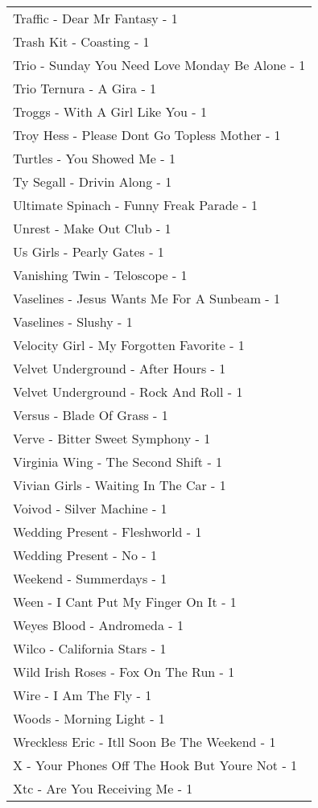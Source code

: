 \documentclass[
]{article}
\begin{document}
\begin{longtable}{l}
Traffic - Dear Mr Fantasy - 1 \\ 
Trash Kit - Coasting - 1 \\ 
Trio - Sunday You Need Love Monday Be Alone - 1 \\ 
Trio Ternura - A Gira - 1 \\ 
Troggs - With A Girl Like You - 1 \\ 
Troy Hess - Please Dont Go Topless Mother - 1 \\ 
Turtles - You Showed Me - 1 \\ 
Ty Segall - Drivin Along - 1 \\ 
Ultimate Spinach - Funny Freak Parade - 1 \\ 
Unrest - Make Out Club - 1 \\ 
Us Girls - Pearly Gates - 1 \\ 
Vanishing Twin - Teloscope - 1 \\ 
Vaselines - Jesus Wants Me For A Sunbeam - 1 \\ 
Vaselines - Slushy - 1 \\ 
Velocity Girl - My Forgotten Favorite - 1 \\ 
Velvet Underground - After Hours - 1 \\ 
Velvet Underground - Rock And Roll - 1 \\ 
Versus - Blade Of Grass - 1 \\ 
Verve - Bitter Sweet Symphony - 1 \\ 
Virginia Wing - The Second Shift - 1 \\ 
Vivian Girls - Waiting In The Car - 1 \\ 
Voivod - Silver Machine - 1 \\ 
Wedding Present - Fleshworld - 1 \\ 
Wedding Present - No - 1 \\ 
Weekend - Summerdays - 1 \\ 
Ween - I Cant Put My Finger On It - 1 \\ 
Weyes Blood - Andromeda - 1 \\ 
Wilco - California Stars - 1 \\ 
Wild Irish Roses - Fox On The Run - 1 \\ 
Wire - I Am The Fly - 1 \\ 
Woods - Morning Light - 1 \\ 
Wreckless Eric - Itll Soon Be The Weekend - 1 \\ 
X - Your Phones Off The Hook But Youre Not - 1 \\ 
Xtc - Are You Receiving Me - 1 \\ 

\end{longtable}
\end{document}
